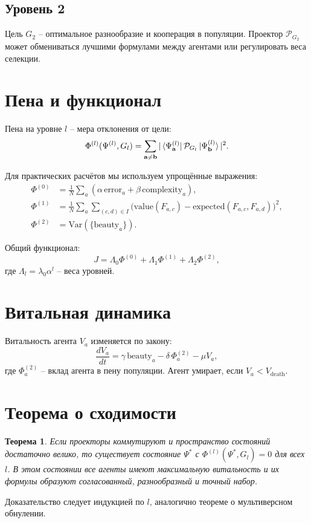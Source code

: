 \documentclass{article}
\newtheorem{theorem}{Теорема}
\begin{document}
\subsection{Уровень 2}
Цель $G_2$ – оптимальное разнообразие и кооперация в популяции. Проектор $\mathcal{P}_{G_2}$ может обмениваться лучшими формулами между агентами или регулировать веса селекции.

\section{Пена и функционал}

Пена на уровне $l$ – мера отклонения от цели:
\[
\Phi^{(l)}(\Psi^{(l)}, G_l) = \sum_{\mathbf{a}\neq\mathbf{b}} |\bra{\Psi_{\mathbf{a}}^{(l)}} \mathcal{P}_{G_l} \ket{\Psi_{\mathbf{b}}^{(l)}}|^2.
\]

Для практических расчётов мы используем упрощённые выражения:
\begin{align*}
\Phi^{(0)} &= \frac{1}{N}\sum_a \left( \alpha\, \text{error}_a + \beta\, \text{complexity}_a \right),\\
\Phi^{(1)} &= \frac{1}{N}\sum_a \sum_{(c,d)\in I} \bigl( \text{value}(F_{a,c}) - \text{expected}(F_{a,c},F_{a,d}) \bigr)^2,\\
\Phi^{(2)} &= \text{Var}(\{\text{beauty}_a\}).
\end{align*}

Общий функционал:
\[
J = \Lambda_0 \Phi^{(0)} + \Lambda_1 \Phi^{(1)} + \Lambda_2 \Phi^{(2)},
\]
где $\Lambda_l = \lambda_0 \alpha^l$ – веса уровней.

\section{Витальная динамика}

Витальность агента $V_a$ изменяется по закону:
\[
\frac{dV_a}{dt} = \gamma \,\text{beauty}_a - \delta \,\Phi^{(2)}_a - \mu V_a,
\]
где $\Phi^{(2)}_a$ – вклад агента в пену популяции. Агент умирает, если $V_a < V_{\text{death}}$.

\section{Теорема о сходимости}

\begin{theorem}
Если проекторы коммутируют и пространство состояний достаточно велико, то существует состояние $\Psi^*$ с $\Phi^{(l)}(\Psi^*, G_l)=0$ для всех $l$. В этом состоянии все агенты имеют максимальную витальность и их формулы образуют согласованный, разнообразный и точный набор.
\end{theorem}

Доказательство следует индукцией по $l$, аналогично теореме о мультиверсном обнулении.
\end{document}
